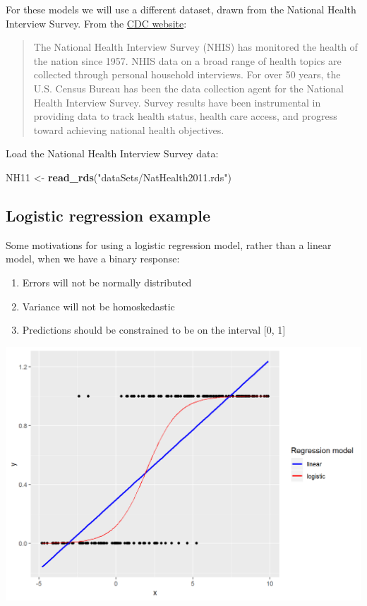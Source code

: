 \documentclass[
]{book}
\newenvironment{Shaded}{\begin{snugshade}}{\end{snugshade}}
\newcommand{\KeywordTok}[1]{\textcolor[rgb]{0.13,0.29,0.53}{\textbf{#1}}}
\newcommand{\NormalTok}[1]{#1}
\newcommand{\StringTok}[1]{\textcolor[rgb]{0.31,0.60,0.02}{#1}}
\providecommand{\tightlist}{%
  \setlength{\itemsep}{0pt}\setlength{\parskip}{0pt}}
\begin{document}
For these models we will use a different dataset, drawn from the National Health Interview Survey. From the \href{http://www.cdc.gov/nchs/nhis.htm}{CDC website}:

\begin{quote}
The National Health Interview Survey (NHIS) has monitored the health of the nation since 1957. NHIS data on a broad range of health topics are collected through personal household interviews. For over 50 years, the U.S. Census Bureau has been the data collection agent for the National Health Interview Survey. Survey results have been instrumental in providing data to track health status, health care access, and progress toward achieving national health objectives.
\end{quote}

Load the National Health Interview Survey data:

\begin{Shaded}
\begin{Highlighting}[]
\NormalTok{  NH11 \textless{}{-}}\StringTok{ }\KeywordTok{read\_rds}\NormalTok{(}\StringTok{"dataSets/NatHealth2011.rds"}\NormalTok{)}
\end{Highlighting}
\end{Shaded}

\hypertarget{logistic-regression-example}{%
\subsection{Logistic regression example}\label{logistic-regression-example}}

Some motivations for using a logistic regression model, rather than a linear model, when we have a binary response:

\begin{enumerate}
\def\labelenumi{\arabic{enumi}.}
\tightlist
\item
  Errors will not be normally distributed
\item
  Variance will not be homoskedastic
\item
  Predictions should be constrained to be on the interval {[}0, 1{]}
\end{enumerate}

\includegraphics{R/Rmodels/images/logistic.png}
\end{document}
